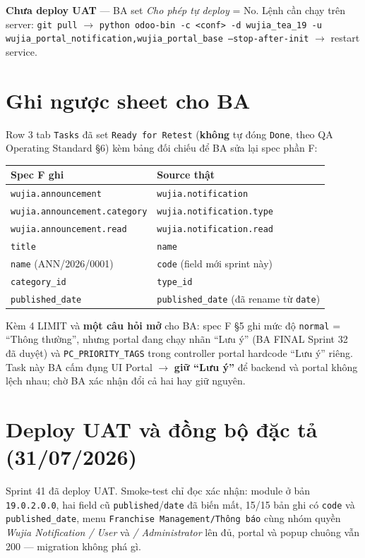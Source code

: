 \textbf{Chưa deploy UAT} --- BA set \emph{Cho phép tự deploy} = No. Lệnh cần chạy trên server:
\texttt{git pull} $\to$
\texttt{python odoo-bin -c <conf> -d wujia\_tea\_19 -u wujia\_portal\_notification,wujia\_portal\_base --stop-after-init}
$\to$ restart service.

\section{Ghi ngược sheet cho BA}

Row 3 tab \texttt{Tasks} đã set \texttt{Ready for Retest} (\textbf{không} tự đóng \texttt{Done},
theo QA Operating Standard §6) kèm bảng đối chiếu để BA sửa lại spec phần F:

\begin{center}
\begin{tabular}{ll}
\hline
\textbf{Spec F ghi} & \textbf{Source thật} \\
\hline
\texttt{wujia.announcement} & \texttt{wujia.notification} \\
\texttt{wujia.announcement.category} & \texttt{wujia.notification.type} \\
\texttt{wujia.announcement.read} & \texttt{wujia.notification.read} \\
\texttt{title} & \texttt{name} \\
\texttt{name} (ANN/2026/0001) & \texttt{code} (field mới sprint này) \\
\texttt{category\_id} & \texttt{type\_id} \\
\texttt{published\_date} & \texttt{published\_date} (đã rename từ \texttt{date}) \\
\hline
\end{tabular}
\end{center}

Kèm 4 LIMIT và \textbf{một câu hỏi mở} cho BA: spec F §5 ghi mức độ \texttt{normal} =
``Thông thường'', nhưng portal đang chạy nhãn ``Lưu ý'' (BA FINAL Sprint 32 đã duyệt) và
\texttt{PC\_PRIORITY\_TAGS} trong controller portal hardcode ``Lưu ý'' riêng. Task này BA cấm đụng
UI Portal $\to$ \textbf{giữ ``Lưu ý''} để backend và portal không lệch nhau; chờ BA xác nhận đổi cả
hai hay giữ nguyên.

\section{Deploy UAT và đồng bộ đặc tả (31/07/2026)}

Sprint 41 đã deploy UAT. Smoke-test chỉ đọc xác nhận: module ở bản \texttt{19.0.2.0.0}, hai field cũ
\texttt{published}/\texttt{date} đã biến mất, 15/15 bản ghi có \texttt{code} và
\texttt{published\_date}, menu \texttt{Franchise Management/Thông báo} cùng nhóm quyền
\emph{Wujia Notification / User} và \emph{/ Administrator} lên đủ, portal và popup chuông vẫn 200 ---
migration không phá gì.

